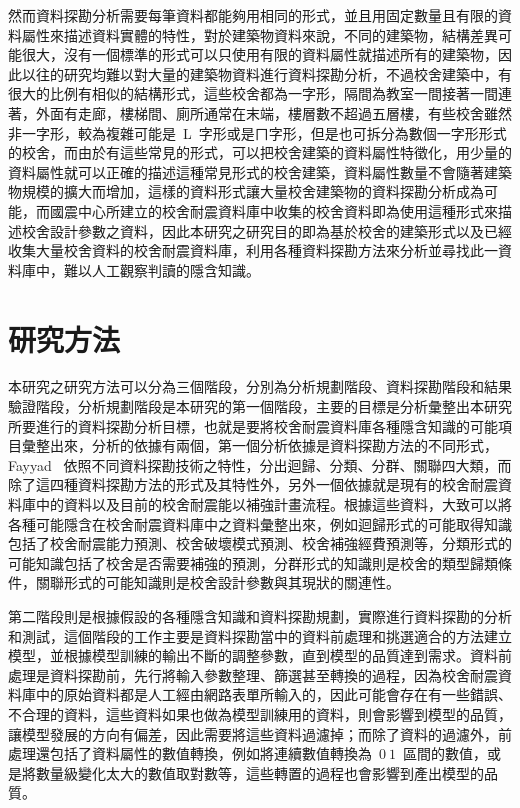 然而資料探勘分析需要每筆資料都能夠用相同的形式，並且用固定數量且有限的資料屬性來描述資料實體的特性，對於建築物資料來說，不同的建築物，結構差異可能很大，沒有一個標準的形式可以只使用有限的資料屬性就描述所有的建築物，因此以往的研究均難以對大量的建築物資料進行資料探勘分析，不過校舍建築中，有很大的比例有相似的結構形式，這些校舍都為一字形，隔間為教室一間接著一間連著，外面有走廊，樓梯間、廁所通常在末端，樓層數不超過五層樓，有些校舍雖然非一字形，較為複雜可能是~L~字形或是ㄇ字形，但是也可拆分為數個一字形形式的校舍，而由於有這些常見的形式，可以把校舍建築的資料屬性特徵化，用少量的資料屬性就可以正確的描述這種常見形式的校舍建築，資料屬性數量不會隨著建築物規模的擴大而增加，這樣的資料形式讓大量校舍建築物的資料探勘分析成為可能，而國震中心所建立的校舍耐震資料庫中收集的校舍資料即為使用這種形式來描述校舍設計參數之資料，因此本研究之研究目的即為基於校舍的建築形式以及已經收集大量校舍資料的校舍耐震資料庫，利用各種資料探勘方法來分析並尋找此一資料庫中，難以人工觀察判讀的隱含知識。

\section{研究方法}

本研究之研究方法可以分為三個階段，分別為分析規劃階段、資料探勘階段和結果驗證階段，分析規劃階段是本研究的第一個階段，主要的目標是分析彙整出本研究所要進行的資料探勘分析目標，也就是要將校舍耐震資料庫各種隱含知識的可能項目彙整出來，分析的依據有兩個，第一個分析依據是資料探勘方法的不同形式，Fayyad~\cite{fayyad1996data} 依照不同資料探勘技術之特性，分出迴歸、分類、分群、關聯四大類，而除了這四種資料探勘方法的形式及其特性外，另外一個依據就是現有的校舍耐震資料庫中的資料以及目前的校舍耐震能以補強計畫流程。根據這些資料，大致可以將各種可能隱含在校舍耐震資料庫中之資料彙整出來，例如迴歸形式的可能取得知識包括了校舍耐震能力預測、校舍破壞模式預測、校舍補強經費預測等，分類形式的可能知識包括了校舍是否需要補強的預測，分群形式的知識則是校舍的類型歸類條件，關聯形式的可能知識則是校舍設計參數與其現狀的關連性。

第二階段則是根據假設的各種隱含知識和資料探勘規劃，實際進行資料探勘的分析和測試，這個階段的工作主要是資料探勘當中的資料前處理和挑選適合的方法建立模型，並根據模型訓練的輸出不斷的調整參數，直到模型的品質達到需求。資料前處理是資料探勘前，先行將輸入參數整理、篩選甚至轉換的過程，因為校舍耐震資料庫中的原始資料都是人工經由網路表單所輸入的，因此可能會存在有一些錯誤、不合理的資料，這些資料如果也做為模型訓練用的資料，則會影響到模型的品質，讓模型發展的方向有偏差，因此需要將這些資料過濾掉；而除了資料的過濾外，前處理還包括了資料屬性的數值轉換，例如將連續數值轉換為~$0 ~ 1$~區間的數值，或是將數量級變化太大的數值取對數等，這些轉置的過程也會影響到產出模型的品質。

